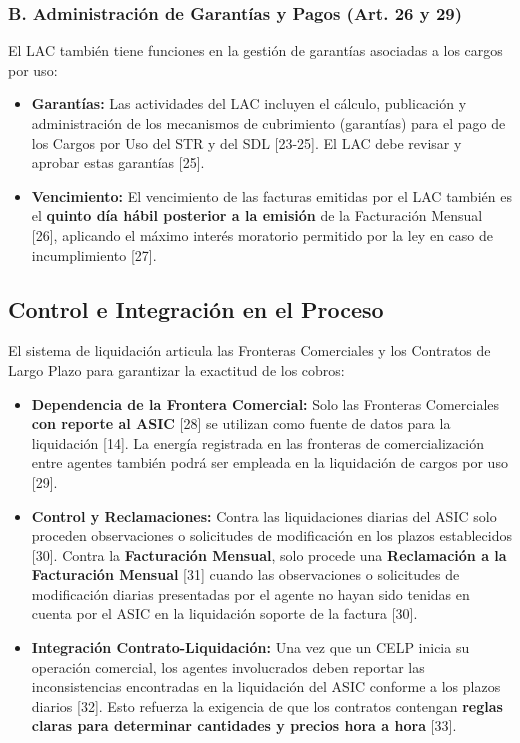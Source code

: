 \documentclass[a5paper]{book}%
\begin{document}
\subsubsection*{B. Administración de Garantías y Pagos (Art. 26 y 29)}
El LAC también tiene funciones en la gestión de garantías asociadas a los cargos por uso:
\begin{itemize}
	\item \textbf{Garantías:} Las actividades del LAC incluyen el cálculo, publicación y administración de los mecanismos de cubrimiento (garantías) para el pago de los Cargos por Uso del STR y del SDL [23-25]. El LAC debe revisar y aprobar estas garantías [25].
	\item \textbf{Vencimiento:} El vencimiento de las facturas emitidas por el LAC también es el \textbf{quinto día hábil posterior a la emisión} de la Facturación Mensual [26], aplicando el máximo interés moratorio permitido por la ley en caso de incumplimiento [27].
\end{itemize}

\subsection{Control e Integración en el Proceso}

El sistema de liquidación articula las Fronteras Comerciales y los Contratos de Largo Plazo para garantizar la exactitud de los cobros:

\begin{itemize}
	\item \textbf{Dependencia de la Frontera Comercial:} Solo las Fronteras Comerciales \textbf{con reporte al ASIC} [28] se utilizan como fuente de datos para la liquidación [14]. La energía registrada en las fronteras de comercialización entre agentes también podrá ser empleada en la liquidación de cargos por uso [29].
	\item \textbf{Control y Reclamaciones:} Contra las liquidaciones diarias del ASIC solo proceden observaciones o solicitudes de modificación en los plazos establecidos [30]. Contra la \textbf{Facturación Mensual}, solo procede una \textbf{Reclamación a la Facturación Mensual} [31] cuando las observaciones o solicitudes de modificación diarias presentadas por el agente no hayan sido tenidas en cuenta por el ASIC en la liquidación soporte de la factura [30].
	\item \textbf{Integración Contrato-Liquidación:} Una vez que un CELP inicia su operación comercial, los agentes involucrados deben reportar las inconsistencias encontradas en la liquidación del ASIC conforme a los plazos diarios [32]. Esto refuerza la exigencia de que los contratos contengan \textbf{reglas claras para determinar cantidades y precios hora a hora} [33].
\end{itemize}
\end{document}
